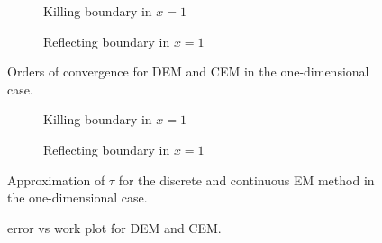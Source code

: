 \begin{figure}[t]
    \centering
    \begin{subfigure}{0.49\linewidth}
        \centering
        \resizebox{1\linewidth}{!}{ }  
        \caption{Killing boundary in $x = 1$}
        \label{fig:KillOneD}
    \end{subfigure}
    \begin{subfigure}{0.49\linewidth}
        \centering
        \resizebox{1\linewidth}{!}{ }  
        \caption{Reflecting boundary in $x = 1$}
        \label{fig:ReflectOneD}
    \end{subfigure}    
    \caption{Orders of convergence for DEM and CEM in the one-dimensional case.}
    \label{fig:OrdersOneD}
\end{figure}

\begin{figure}[t]
    \centering
    \begin{subfigure}{0.49\linewidth}
        \centering
        \resizebox{1\linewidth}{!}{ }  
        \caption{Killing boundary in $x = 1$}
        \label{fig:ApproxOneD}
    \end{subfigure}
    \begin{subfigure}{0.49\linewidth}
        \centering
        \resizebox{1\linewidth}{!}{ }  
        \caption{Reflecting boundary in $x = 1$}
        \label{fig:ApproxOneD}
    \end{subfigure}    
    \caption{Approximation of $\tau$ for the discrete and continuous EM method in the one-dimensional case.}
    \label{fig:ApproxOneD}
\end{figure}

\begin{figure}[t]
        \centering
        \resizebox{0.6\linewidth}{!}{ }  
        \caption{error vs work plot for DEM and CEM.}
        \label{fig:CompTime}
\end{figure}
